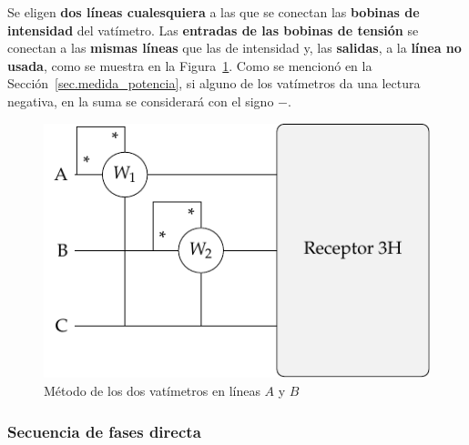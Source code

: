 	Se eligen \textbf{dos líneas cualesquiera} a las que se conectan las \textbf{bobinas de intensidad} del vatímetro. Las \textbf{entradas de las bobinas de tensión} se conectan a las \textbf{mismas líneas} que las de intensidad y, las \textbf{salidas}, a la \textbf{línea no usada}, como se muestra en la Figura~\ref{fig.potencia3H}. Como se mencionó en la Sección~\ref{sec.medida_potencia}, si alguno de los vatímetros da una lectura negativa, en la suma se considerará con el signo $-$.   
	\begin{figure}[H]
	    \centering
	    \includegraphics{../figs/Potencia3H.pdf}
	    \caption{Método de los dos vatímetros en líneas $A$ y $B$}
	    \label{fig.potencia3H}
	\end{figure}
	
	\subsubsection{Secuencia de fases directa}
	
